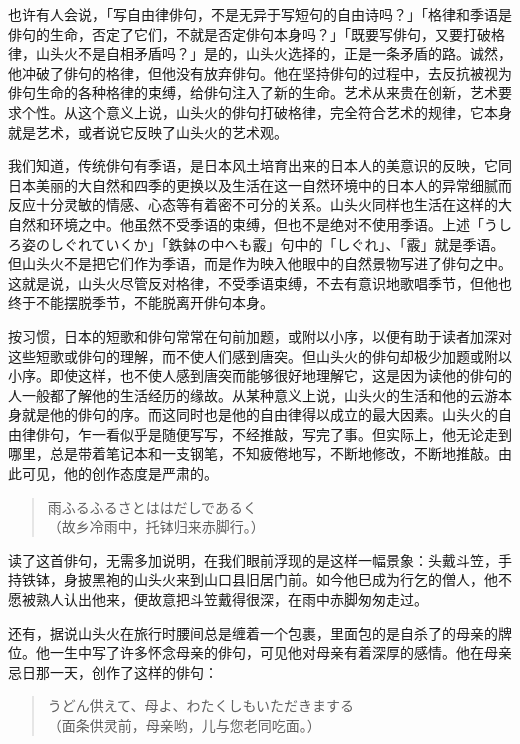 {    也许有人会说，「写自由律俳句，不是无异于写短句的自由诗吗？」「格律和季语是俳句的生命，否定了它们，不就是否定俳句本身吗？」「既要写俳句，又要打破格律，山头火不是自相矛盾吗？」是的，山头火选择的，正是一条矛盾的路。诚然，他冲破了俳句的格律，但他没有放弃俳句。他在坚持俳句的过程中，去反抗被视为俳句生命的各种格律的束缚，给俳句注入了新的生命。艺术从来贵在创新，艺术要求个性。从这个意义上说，山头火的俳句打破格律，完全符合艺术的规律，它本身就是艺术，或者说它反映了山头火的艺术观。

    我们知道，传统俳句有季语，是日本风土培育出来的日本人的美意识的反映，它同日本美丽的大自然和四季的更换以及生活在这一自然环境中的日本人的异常细腻而反应十分灵敏的情感、心态等有着密不可分的关系。山头火同样也生活在这样的大自然和环境之中。他虽然不受季语的束缚，但也不是绝对不使用季语。上述「{\FM うしろ姿のしぐれていくか}」「{\FM 鉄鉢の中へも霰}」句中的「{\FM しぐれ}」、「{\FM 霰}」就是季语。但山头火不是把它们作为季语，而是作为映入他眼中的自然景物写进了俳句之中。这就是说，山头火尽管反对格律，不受季语束缚，不去有意识地歌唱季节，但他也终于不能摆脱季节，不能脱离开俳句本身。

    按习惯，日本的短歌和俳句常常在句前加题，或附以小序，以便有助于读者加深对这些短歌或俳句的理解，而不使人们感到唐突。但山头火的俳句却极少加题或附以小序。即使这样，也不使人感到唐突而能够很好地理解它，这是因为读他的俳句的人一般都了解他的生活经历的缘故。从某种意义上说，山头火的生活和他的云游本身就是他的俳句的序。而这同时也是他的自由律得以成立的最大因素。山头火的自由律俳句，乍一看似乎是随便写写，不经推敲，写完了事。但实际上，他无论走到哪里，总是带着笔记本和一支钢笔，不知疲倦地写，不断地修改，不断地推敲。由此可见，他的创作态度是严肃的。

    \begin{quote}
        {\FM 雨ふるふるさとははだしであるく}\\
        （故乡冷雨中，托钵归来赤脚行。）
    \end{quote}

    读了这首俳句，无需多加说明，在我们眼前浮现的是这样一幅景象：头戴斗笠，手持铁钵，身披黑袍的山头火来到山口县旧居门前。如今他巳成为行乞的僧人，他不愿被熟人认出他来，便故意把斗笠戴得很深，在雨中赤脚匆匆走过。

    还有，据说山头火在旅行时腰间总是缠着一个包裹，里面包的是自杀了的母亲的牌位。他一生中写了许多怀念母亲的俳句，可见他对母亲有着深厚的感情。他在母亲忌日那一天，创作了这样的俳句：

    \begin{quote}
        {\FM うどん供えて、母よ、わたくしもいただきまする}\\
        （面条供灵前，母亲哟，儿与您老同吃面。\footnotemark[1]）
    \end{quote}

}
